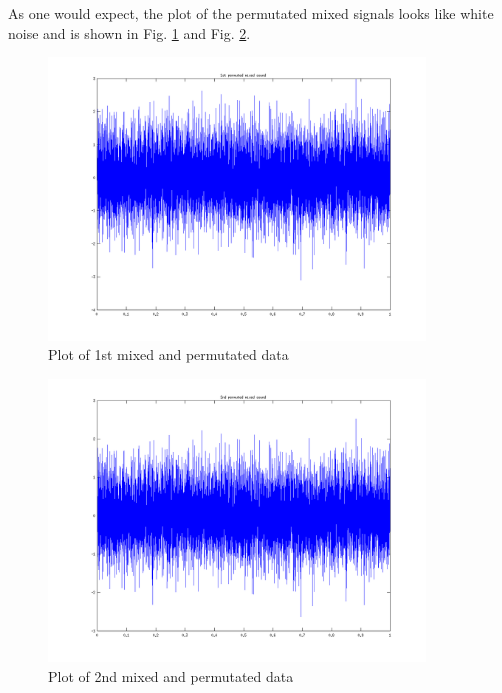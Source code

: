 \documentclass{article}
\begin{document}
		As one would expect, the plot of the permutated mixed signals looks like white noise and is shown in Fig. \ref{fig:mixed1} and Fig. \ref{fig:mixed2}.
		\begin{figure}[H]
			\centering
			\includegraphics[width=10cm]{mixed1.png}
			\caption{Plot of 1st mixed and permutated data}
			\label{fig:mixed1}
		\end{figure}
		\begin{figure}[H]
			\centering
			\includegraphics[width=10cm]{mixed2.png}
			\caption{Plot of 2nd mixed and permutated data}
			\label{fig:mixed2}
		\end{figure}
		
\end{document}
